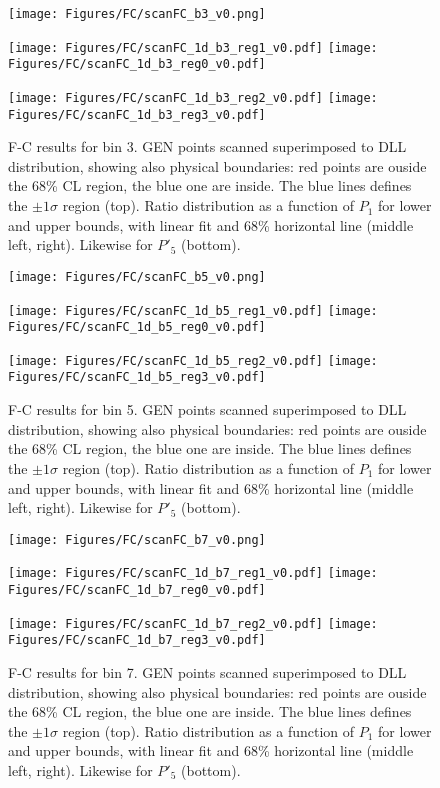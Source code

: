 \begin{figure}
  \centering
  \texttt{[image: Figures/FC/scanFC\_b3\_v0.png]}

  \texttt{[image: Figures/FC/scanFC\_1d\_b3\_reg1\_v0.pdf]}
  \texttt{[image: Figures/FC/scanFC\_1d\_b3\_reg0\_v0.pdf]}

  \texttt{[image: Figures/FC/scanFC\_1d\_b3\_reg2\_v0.pdf]}
  \texttt{[image: Figures/FC/scanFC\_1d\_b3\_reg3\_v0.pdf]}

  \caption{F-C results for bin 3.
    GEN points scanned superimposed to DLL distribution, showing also physical boundaries: red points are ouside the 68\% CL region, the blue one are inside.
    The blue lines defines the $\pm1\sigma$ region (top).
    Ratio distribution as a function of $P_1$ for lower and upper bounds, with linear fit and 68\% horizontal line (middle left, right).
    Likewise for $P'_5$ (bottom).}
  \label{fig:FC3}
\end{figure}

\begin{figure}
  \centering
  \texttt{[image: Figures/FC/scanFC\_b5\_v0.png]}

  \texttt{[image: Figures/FC/scanFC\_1d\_b5\_reg1\_v0.pdf]}
  \texttt{[image: Figures/FC/scanFC\_1d\_b5\_reg0\_v0.pdf]}

  \texttt{[image: Figures/FC/scanFC\_1d\_b5\_reg2\_v0.pdf]}
  \texttt{[image: Figures/FC/scanFC\_1d\_b5\_reg3\_v0.pdf]}

  \caption{F-C results for bin 5.
    GEN points scanned superimposed to DLL distribution, showing also physical boundaries: red points are ouside the 68\% CL region, the blue one are inside.
    The blue lines defines the $\pm1\sigma$ region (top).
    Ratio distribution as a function of $P_1$ for lower and upper bounds, with linear fit and 68\% horizontal line (middle left, right).
    Likewise for $P'_5$ (bottom).}
  \label{fig:FC5}
\end{figure}

\begin{figure}
  \centering
  \texttt{[image: Figures/FC/scanFC\_b7\_v0.png]}

  \texttt{[image: Figures/FC/scanFC\_1d\_b7\_reg1\_v0.pdf]}
  \texttt{[image: Figures/FC/scanFC\_1d\_b7\_reg0\_v0.pdf]}

  \texttt{[image: Figures/FC/scanFC\_1d\_b7\_reg2\_v0.pdf]}
  \texttt{[image: Figures/FC/scanFC\_1d\_b7\_reg3\_v0.pdf]}

  \caption{F-C results for bin 7.
    GEN points scanned superimposed to DLL distribution, showing also physical boundaries: red points are ouside the 68\% CL region, the blue one are inside.
    The blue lines defines the $\pm1\sigma$ region (top).
    Ratio distribution as a function of $P_1$ for lower and upper bounds, with linear fit and 68\% horizontal line (middle left, right).
    Likewise for $P'_5$ (bottom).}
  \label{fig:FC7}
\end{figure}

